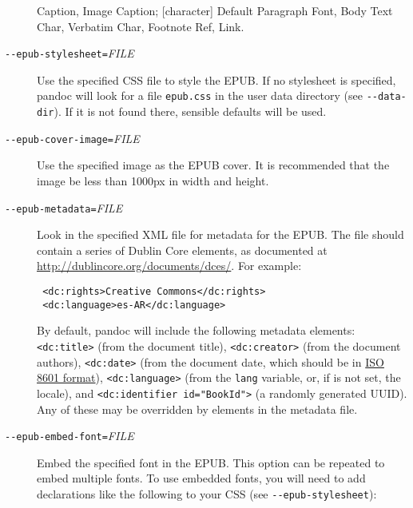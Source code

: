 \documentclass[]{article}
\begin{document}
\begin{description}
Caption, Image Caption; {[}character{]} Default Paragraph Font, Body
Text Char, Verbatim Char, Footnote Ref, Link.
\item[\texttt{-{}-epub-stylesheet=}\emph{FILE}]
Use the specified CSS file to style the EPUB. If no stylesheet is
specified, pandoc will look for a file \texttt{epub.css} in the user
data directory (see \texttt{-{}-data-dir}). If it is not found there,
sensible defaults will be used.
\item[\texttt{-{}-epub-cover-image=}\emph{FILE}]
Use the specified image as the EPUB cover. It is recommended that the
image be less than 1000px in width and height.
\item[\texttt{-{}-epub-metadata=}\emph{FILE}]
Look in the specified XML file for metadata for the EPUB. The file
should contain a series of Dublin Core elements, as documented at
\url{http://dublincore.org/documents/dces/}. For example:

\begin{verbatim}
 <dc:rights>Creative Commons</dc:rights>
 <dc:language>es-AR</dc:language>
\end{verbatim}

By default, pandoc will include the following metadata elements:
\texttt{\textless{}dc:title\textgreater{}} (from the document title),
\texttt{\textless{}dc:creator\textgreater{}} (from the document
authors), \texttt{\textless{}dc:date\textgreater{}} (from the document
date, which should be in \href{http://www.w3.org/TR/NOTE-datetime}{ISO
8601 format}), \texttt{\textless{}dc:language\textgreater{}} (from the
\texttt{lang} variable, or, if is not set, the locale), and
\texttt{\textless{}dc:identifier id="BookId"\textgreater{}} (a randomly
generated UUID). Any of these may be overridden by elements in the
metadata file.
\item[\texttt{-{}-epub-embed-font=}\emph{FILE}]
Embed the specified font in the EPUB. This option can be repeated to
embed multiple fonts. To use embedded fonts, you will need to add
declarations like the following to your CSS (see
\texttt{-{}-epub-stylesheet}):


\end{description}
\end{document}
